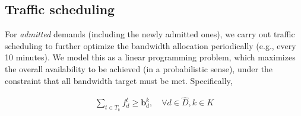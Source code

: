 \documentclass[sigconf]{acmart}
\begin{document}



\subsection{Traffic scheduling} \label{TE}

For \textit{admitted} demands (including the newly admitted ones), 
we carry out traffic scheduling to further optimize the bandwidth allocation periodically (e.g., every 10 minutes).
We model this as a linear programming problem, which maximizes the overall availability to be achieved (in a probabilistic sense), under the constraint that all bandwidth target must be met. Specifically, 

\begin{eqnarray} \label{Smaller}
 \sum_{t\in T_{k}} f_{d}^t \ge \mathbf{b}^k_d, \quad  \forall d \in \hat{D}, k \in K
\end{eqnarray}



\end{document}
